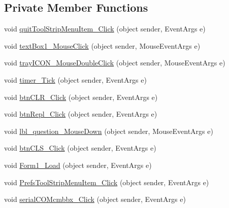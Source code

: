 \subsection*{\-Private \-Member \-Functions}
\begin{DoxyCompactItemize}
\item 
void \hyperlink{class_sr_p___classroom_inq_1_1frm_classrrom_inq_a1f6806f1c728c11daf09a988688026d5}{quit\-Tool\-Strip\-Menu\-Item\-\_\-\-Click} (object sender, \-Event\-Args e)
\item 
void \hyperlink{class_sr_p___classroom_inq_1_1frm_classrrom_inq_a6f61cf0772c5333dcd80c6fe143cae2d}{text\-Box1\-\_\-\-Mouse\-Click} (object sender, \-Mouse\-Event\-Args e)
\item 
void \hyperlink{class_sr_p___classroom_inq_1_1frm_classrrom_inq_a7ec6569db6ff275c78bd80bd50646610}{tray\-I\-C\-O\-N\-\_\-\-Mouse\-Double\-Click} (object sender, \-Mouse\-Event\-Args e)
\item 
void \hyperlink{class_sr_p___classroom_inq_1_1frm_classrrom_inq_a07132b1925da00a6b4673e893f719465}{timer\-\_\-\-Tick} (object sender, \-Event\-Args e)
\item 
void \hyperlink{class_sr_p___classroom_inq_1_1frm_classrrom_inq_a5577422488a2959e7e039a95d85506cd}{btn\-C\-L\-R\-\_\-\-Click} (object sender, \-Event\-Args e)
\item 
void \hyperlink{class_sr_p___classroom_inq_1_1frm_classrrom_inq_a65ba92a7bf3839c796abc965f5524b0f}{btn\-Repl\-\_\-\-Click} (object sender, \-Event\-Args e)
\item 
void \hyperlink{class_sr_p___classroom_inq_1_1frm_classrrom_inq_a58eac2c8a22afb14b3090a1cdd73ea1b}{lbl\-\_\-question\-\_\-\-Mouse\-Down} (object sender, \-Mouse\-Event\-Args e)
\item 
void \hyperlink{class_sr_p___classroom_inq_1_1frm_classrrom_inq_a39589edc035bae2c2775afcea57d2798}{btn\-C\-L\-S\-\_\-\-Click} (object sender, \-Event\-Args e)
\item 
void \hyperlink{class_sr_p___classroom_inq_1_1frm_classrrom_inq_ac71625cc47c0a4bfa92bd4f83e8c7bb6}{\-Form1\-\_\-\-Load} (object sender, \-Event\-Args e)
\item 
void \hyperlink{class_sr_p___classroom_inq_1_1frm_classrrom_inq_abce1cb97617c664a4d967eed8c5f9c86}{\-Prefs\-Tool\-Strip\-Menu\-Item\-\_\-\-Click} (object sender, \-Event\-Args e)
\item 
void \hyperlink{class_sr_p___classroom_inq_1_1frm_classrrom_inq_a07401ed0357e442240346cc777bf5acd}{serial\-C\-O\-Mcmbbx\-\_\-\-Click} (object sender, \-Event\-Args e)

\end{DoxyCompactItemize}
